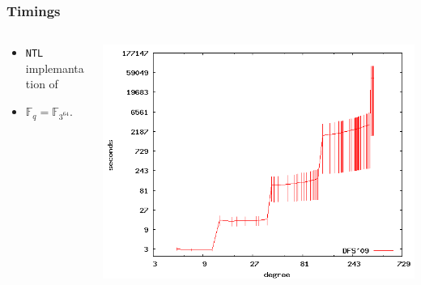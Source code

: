 \documentclass[10pt]{beamer}
\newcommand{\F}{\mathbb{F}}  %
\newcommand{\0}{\mathcal{O}}  %
\begin{document}
\begin{frame}
  \frametitle{Timings}

  
  \begin{columns}
    \begin{column}{0.4\textwidth}
      \begin{itemize}
      \item \texttt{NTL} implemantation of \cite{DFS09}
      \item $\F_q = \F_{3^{64}}$.
      \end{itemize}
    \end{column}
    \begin{column}{0.6\textwidth}
             {\includegraphics[width=\textwidth]{3-64}}


\end{column}
\end{columns}
\end{frame}
\end{document}
